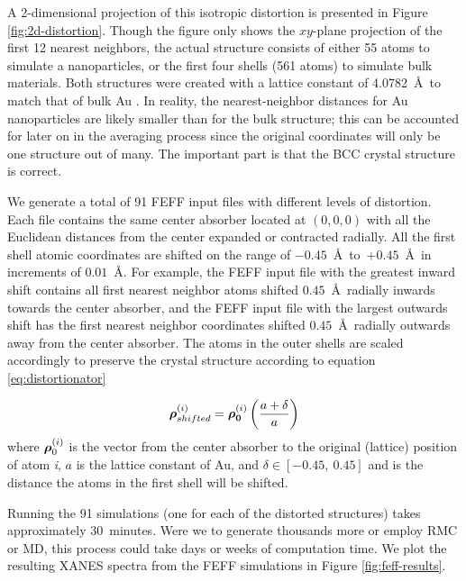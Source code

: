 A 2-dimensional projection of this isotropic distortion is presented in Figure \ref{fig:2d-distortion}. Though the figure only shows the $xy$\nobreakdash-plane projection of the first 12 nearest neighbors, the actual structure consists of either 55 atoms to simulate a nanoparticles, or the first four shells (561 atoms) to simulate bulk materials. Both structures were created with a lattice constant of 4.0782~\AA~to match that of bulk Au \cite{gold-a-value-data}. In reality, the nearest-neighbor distances for Au nanoparticles are likely smaller than for the bulk structure; this can be accounted for later on in the averaging process since the original coordinates will only be one structure out of many. The important part is that the BCC crystal structure is correct. 

We generate a total of 91 FEFF input files with different levels of distortion. Each file contains the same center absorber located at $(0,0,0)$ with all the Euclidean distances from the center expanded or contracted radially. All the first shell atomic coordinates are shifted on the range of $ -0.45 $~\AA~to~$ +0.45 $~\AA~in increments of $ 0.01 $~\AA. For example, the FEFF input file with the greatest inward shift contains all first nearest neighbor atoms shifted $ 0.45 $~\AA~radially inwards towards the center absorber, and the FEFF input file with the largest outwards shift has the first nearest neighbor coordinates shifted $ 0.45 $~\AA~radially outwards away from the center absorber. The atoms in the outer shells are scaled accordingly to preserve the crystal structure according to equation \ref{eq:distortionator}

\begin{equation}
	\label{eq:distortionator}
	\vb*{\rho}_{shifted}^{(i)} = \vb*{\rho_0}^{(i)} \left( \dfrac{a + \delta}{a} \right)
\end{equation}
where $ \vb*{\rho}_0^{(i)} $ is the vector from the center absorber to the original (lattice) position of atom \textit{i}, $ a $ is the lattice constant of Au, and $ \delta \in [-0.45,~0.45] $ and is the distance the atoms in the first shell will be shifted.   


Running the 91 simulations (one for each of the distorted structures) takes approximately 30~minutes. Were we to generate thousands more or employ RMC or MD, this process could take days or weeks of computation time. We plot the resulting XANES spectra from the FEFF simulations in Figure \ref{fig:feff-results}.

